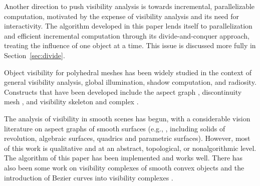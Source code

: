 \documentclass[9pt,twocolumn]{article}
\begin{document}
Another direction to push visibility analysis is towards incremental, parallelizable
computation, motivated by the expense of visibility analysis
and its need for interactivity.
The algorithm developed in this paper lends itself to parallelization and efficient
incremental computation through its divide-and-conquer approach, treating the influence
of one object at a time.
This issue is discussed more fully in Section~\ref{sec:divide}.

Object visibility for polyhedral meshes 
has been widely studied in the context of general visibility analysis,
global illumination, shadow computation, and radiosity.
Constructs that have been developed include the 
aspect graph \cite{gigus90}, 
discontinuity mesh \cite{drettakis94,heckbert92a,lischinski92,stewart94}, and
visibility skeleton and complex \cite{durand96,durand97a,pocchiola96}.

The analysis of visibility in smooth scenes %
has begun, with a considerable vision literature on aspect graphs 
of smooth surfaces (e.g., \cite{chen91,eggert93,koenderink76,petitjean92,ponce90},
including solids of revolution, algebraic surfaces, quadrics and parametric surfaces).
However, most of this work is qualitative
and at an abstract, topological, or nonalgorithmic level.
The algorithm of this paper has been implemented and works well.
There has also been some work on
visibility complexes of smooth convex objects \cite{durand97b} and
the introduction of Bezier curves into visibility complexes \cite{baciu00}.
\end{document}
